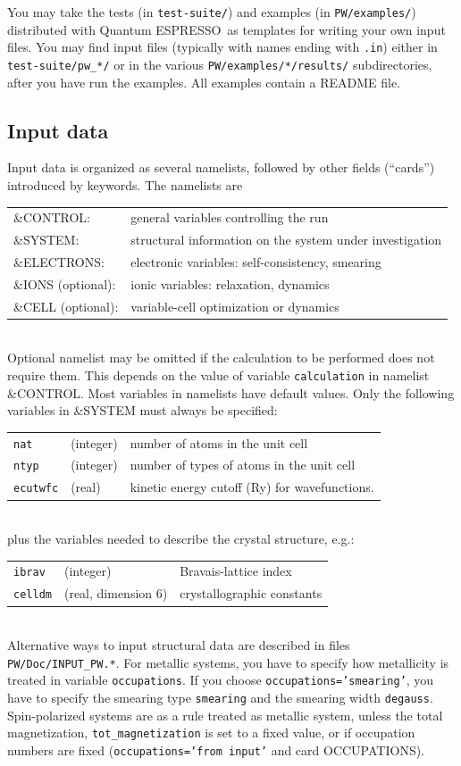\documentclass[12pt,a4paper]{article}
\def\qe{{\sc Quantum ESPRESSO}}
\begin{document}
You may take the tests (in \texttt{test-suite/}) and examples
(in \texttt{PW/examples/}) distributed with \qe\ as templates for
writing your own input files. You may find input files (typically
with names ending with \texttt{.in}) either in \texttt{test-suite/pw\_*/}
or in the various \texttt{PW/examples/*/results/} subdirectories,
after you have run the examples. All examples contain a README file.

\subsection{Input data}

Input data 
is organized as several namelists, followed by other fields (``cards'')
introduced by keywords. The namelists are

\begin{tabular}{ll}
      \&CONTROL:& general variables controlling the run\\
      \&SYSTEM: &structural information on the system under investigation\\
      \&ELECTRONS: &electronic variables: self-consistency, smearing\\
      \&IONS (optional): &ionic variables: relaxation, dynamics\\
      \&CELL (optional): &variable-cell optimization or dynamics\\
\end{tabular}    \\
Optional namelist may be omitted if the calculation to be performed
does not require them. This depends on the value of variable 
\texttt{calculation}
in namelist \&CONTROL. Most variables in namelists have default values. Only
the following variables in \&SYSTEM must always be specified:

\begin{tabular}{lll}
      \texttt{nat} &(integer)& number of atoms in the unit cell\\
      \texttt{ntyp} &(integer)& number of types of atoms in the unit cell\\
      \texttt{ecutwfc} &(real)& kinetic energy cutoff (Ry) for wavefunctions.
\end{tabular}    \\
plus the variables needed to describe the crystal structure, e.g.:
\begin{tabular}{lll}
      \texttt{ibrav} & (integer)& Bravais-lattice index\\
      \texttt{celldm} &(real, dimension 6)& crystallographic constants
\end{tabular}    \\
Alternative ways to input structural data are described in files
\texttt{PW/Doc/INPUT\_PW.*}. For metallic systems, you have to specify
how metallicity is treated in variable \texttt{occupations}.
If you choose \texttt{occupations='smearing'}, you have
to specify the smearing type \texttt{smearing} and the smearing width 
\texttt{degauss}. Spin-polarized systems are as a rule treated as metallic 
system, unless the total magnetization, \texttt{tot\_magnetization}
is set to a fixed value, or if occupation numbers are fixed
(\texttt{occupations='from input'} and card OCCUPATIONS).
    
\end{document}
